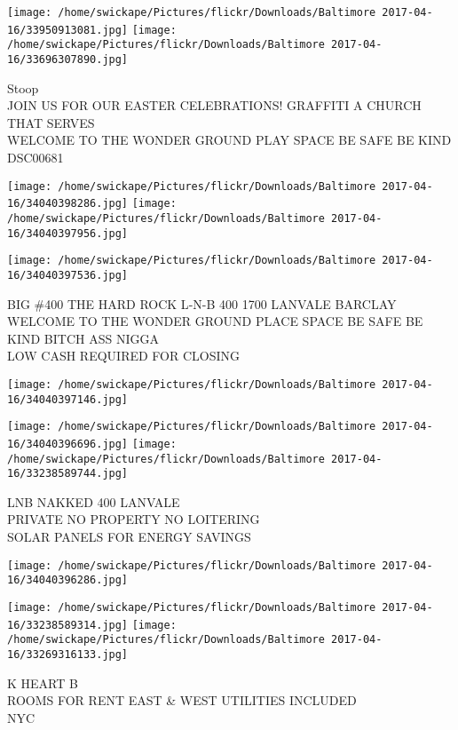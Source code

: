 \documentclass[10pt,letterpaper]{article}
\begin{document}
\texttt{[image: /home/swickape/Pictures/flickr/Downloads/Baltimore 2017-04-16/33950913081.jpg]}
\texttt{[image: /home/swickape/Pictures/flickr/Downloads/Baltimore 2017-04-16/33696307890.jpg]}

Stoop\\
JOIN US FOR OUR EASTER CELEBRATIONS!  GRAFFITI A CHURCH THAT SERVES\\
WELCOME TO THE WONDER GROUND PLAY SPACE BE SAFE BE KIND\\
DSC00681
\pagebreak

\texttt{[image: /home/swickape/Pictures/flickr/Downloads/Baltimore 2017-04-16/34040398286.jpg]}
\texttt{[image: /home/swickape/Pictures/flickr/Downloads/Baltimore 2017-04-16/34040397956.jpg]}

\texttt{[image: /home/swickape/Pictures/flickr/Downloads/Baltimore 2017-04-16/34040397536.jpg]}

BIG \#400 THE HARD ROCK L{-}N{-}B 400 1700 LANVALE BARCLAY\\
WELCOME TO THE WONDER GROUND PLACE SPACE BE SAFE BE KIND BITCH ASS NIGGA\\
LOW CASH REQUIRED FOR CLOSING
\pagebreak

\texttt{[image: /home/swickape/Pictures/flickr/Downloads/Baltimore 2017-04-16/34040397146.jpg]}

\vspace{0.25in}
\texttt{[image: /home/swickape/Pictures/flickr/Downloads/Baltimore 2017-04-16/34040396696.jpg]}
\texttt{[image: /home/swickape/Pictures/flickr/Downloads/Baltimore 2017-04-16/33238589744.jpg]}

LNB NAKKED 400 LANVALE\\
PRIVATE NO PROPERTY NO LOITERING\\
SOLAR PANELS FOR ENERGY SAVINGS
\pagebreak

\texttt{[image: /home/swickape/Pictures/flickr/Downloads/Baltimore 2017-04-16/34040396286.jpg]}

\vspace{0.25in}
\texttt{[image: /home/swickape/Pictures/flickr/Downloads/Baltimore 2017-04-16/33238589314.jpg]}
\texttt{[image: /home/swickape/Pictures/flickr/Downloads/Baltimore 2017-04-16/33269316133.jpg]}

K HEART B\\
ROOMS FOR RENT EAST \& WEST UTILITIES INCLUDED\\
NYC
\pagebreak
\end{document}
